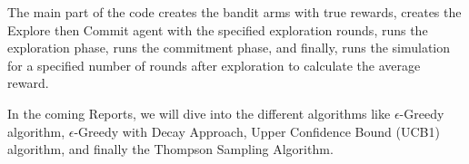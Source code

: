 \documentclass{article}
\begin{document}
The main part of the code creates the bandit arms with true rewards, creates the Explore then Commit agent with the specified exploration rounds, runs the exploration phase, runs the commitment phase, and finally, runs the simulation for a specified number of rounds after exploration to calculate the average reward.







In the coming Reports, we will dive into the different algorithms like $\epsilon$-Greedy algorithm, $\epsilon$-Greedy with Decay Approach, Upper Confidence Bound (UCB1) algorithm, and finally the Thompson Sampling Algorithm.





    
\end{document}
